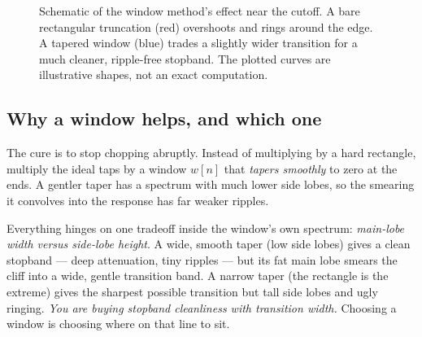 \begin{figure}[H]
\centering
{}
\caption{Schematic of the window method's effect near the cutoff. A bare
rectangular truncation (red) overshoots and rings around the edge. A tapered
window (blue) trades a slightly wider transition for a much cleaner, ripple-free
stopband. The plotted curves are illustrative shapes, not an exact computation.}
\label{ch16:fig-gibbs}
\end{figure}

\subsection{Why a window helps, and which one}
\label{ch16:windows}

The cure is to stop chopping abruptly. Instead of multiplying by a hard
rectangle, multiply the ideal taps by a window $w[n]$ that \emph{tapers smoothly}
to zero at the ends. A gentler taper has a spectrum with much lower side lobes, so
the smearing it convolves into the response has far weaker ripples.

\begin{whybox}
Everything hinges on one tradeoff inside the window's own spectrum: \emph{main-lobe
width versus side-lobe height}. A wide, smooth taper (low side lobes) gives a
clean stopband --- deep attenuation, tiny ripples --- but its fat main lobe
smears the cliff into a wide, gentle transition band. A narrow taper (the
rectangle is the extreme) gives the sharpest possible transition but tall side
lobes and ugly ringing. \emph{You are buying stopband cleanliness with transition
width.} Choosing a window is choosing where on that line to sit.
\end{whybox}

